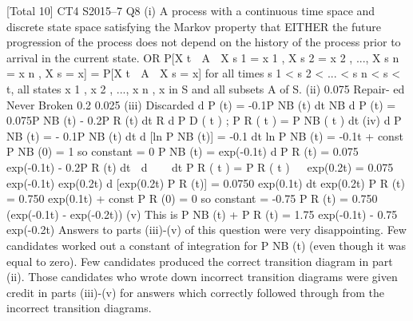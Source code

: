 \documentclass[a4paper,12pt]{article}
\begin{document}
[Total 10]
CT4 S2015–7
\newpage
Q8
(i)
A process with a continuous time space and discrete state space
satisfying the Markov property that
EITHER
the future progression of the process does not depend on the history of the
process prior to arrival in the current state.
OR
P[X t  A  X s 1 = x 1 , X s 2 = x 2 , ..., X s n = x n , X s = x] = P[X t  A  X s = x]
for all times s 1 < s 2 < ... < s n < s < t, all states x 1 , x 2 , ..., x n , x in S and all
subsets A of S.
(ii)
0.075
Repair-
ed
Never
Broken
0.2
0.025
(iii)
Discarded
d
P (t) = -0.1P NB (t)
dt NB
d
P (t) = 0.075P NB (t) - 0.2P R (t)
dt R
d
P D ( t ) ;\+ P R ( t ) \;= P NB ( t )
dt
(iv)
d
P NB (t) = - 0.1P NB (t)
dt
d
[ln P NB (t)] = -0.1
dt
ln P NB (t) = -0.1t + const
P NB (0) = 1 so constant = 0
P NB (t) = exp(-0.1t)
d
P R (t) = 0.075 exp(-0.1t) - 0.2P R (t)
dt
 d

  dt P R ( t ) \;= P R ( t )   exp(0.2t) = 0.075 exp(-0.1t) exp(0.2t)
d
[exp(0.2t) P R (t)] = 0.0750 exp(0.1t)
dt
exp(0.2t) P R (t) = 0.750 exp(0.1t) + const
P R (0) = 0 so constant = -0.75
P R (t) = 0.750 (exp(-0.1t) - exp(-0.2t))
(v)
This is P NB (t) + P R (t)
= 1.75 exp(-0.1t) - 0.75 exp(-0.2t)
Answers to parts (iii)-(v) of this question were very disappointing. Few
candidates worked out a constant of integration for P NB (t) (even though it was
equal to zero). Few candidates produced the correct transition diagram in
part (ii). Those candidates who wrote down incorrect transition diagrams
were given credit in parts (iii)-(v) for answers which correctly followed through
from the incorrect transition diagrams.
\end{document}
